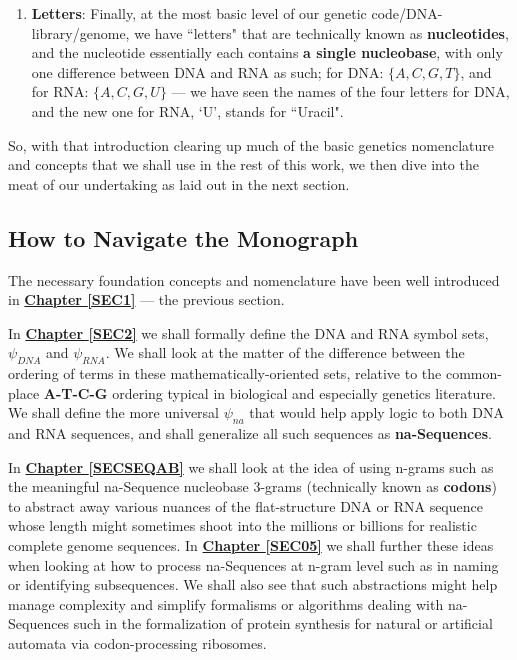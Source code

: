 \documentclass[a4paper, 18pt]{book} %
\begin{document}
\begin{enumerate}
\item \textbf{Letters}: Finally, at the most basic level of our genetic code/DNA-library/genome, we have ``letters" that are technically known as \textbf{nucleotides}, and the nucleotide essentially each contains \textbf{a single nucleobase}, with only one difference between DNA and RNA as such; for DNA: $\{A, C, G, T\}$, and for RNA: $\{A, C, G, U\}$ --- we have seen the names of the four letters for DNA, and the new one for RNA, `U', stands for ``Uracil".
\end{enumerate}


So, with that introduction clearing up much of the basic genetics nomenclature and concepts that we shall use in the rest of this work, we then dive into the meat of our undertaking as laid out in the next section.

\subsection{How to Navigate the Monograph}

The necessary foundation concepts and nomenclature have been well introduced in \textbf{\hyperref[SEC1]{Chapter \ref{SEC1}}} --- the previous section.

In \textbf{\hyperref[SEC2]{Chapter \ref{SEC2}}} we shall formally define the DNA and RNA symbol sets, $\psi_{DNA}$ and $\psi_{RNA}$. We shall look at the matter of the difference between the ordering of terms in these mathematically-oriented sets, relative to the common-place \textbf{A-T-C-G} ordering typical in biological and especially genetics literature. We shall define the more universal $\psi_{na}$ that would help apply logic to both DNA and RNA sequences, and shall generalize all such sequences as \textbf{na-Sequences}.

In \textbf{\hyperref[SECSEQAB]{Chapter \ref{SECSEQAB}}} we shall look at the idea of using n-grams such as the meaningful na-Sequence nucleobase 3-grams (technically known as \textbf{codons}) to abstract away various nuances of the flat-structure DNA or RNA sequence whose length might sometimes shoot into the millions or billions for realistic complete genome sequences. In \textbf{\hyperref[SEC05]{Chapter \ref{SEC05}}} we shall further these ideas when looking at how to process na-Sequences at n-gram level such as in naming or identifying subsequences. We shall also see that such abstractions might help manage complexity and simplify formalisms or algorithms dealing with na-Sequences such in the formalization of protein synthesis for natural or artificial automata via codon-processing ribosomes.
\end{document}

